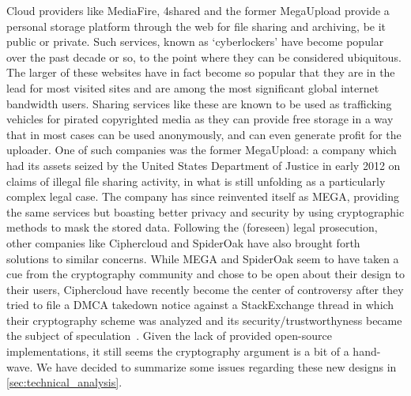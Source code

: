 \documentclass[12pt]{article}
\begin{document}


Cloud providers like MediaFire, 4shared and the former MegaUpload provide a personal storage platform through the web for file sharing and archiving, be it public or private.
Such services, known as `cyberlockers' have become popular over the past decade or so, to the point where they can be considered ubiquitous.
The larger of these websites have in fact become so popular that they are in the lead for most visited sites and are among the most significant global internet bandwidth users.
Sharing services like these are known to be used as trafficking vehicles for pirated copyrighted media as they can provide free storage in a way that in most cases can be used anonymously, and can even generate profit for the uploader.
One of such companies was the former MegaUpload: a company which had its assets seized by the United States Department of Justice in early 2012 on claims of illegal file sharing activity, in what is still unfolding as a particularly complex legal case.
The company has since reinvented itself as MEGA, providing the same services but boasting better privacy and security by using cryptographic methods to mask the stored data.
Following the (foreseen) legal prosecution, other companies like Ciphercloud and SpiderOak have also brought forth solutions to similar concerns.
While MEGA and SpiderOak seem to have taken a cue from the cryptography community and chose to be open about their design to their users, Ciphercloud have recently become the center of controversy after they tried to file a DMCA takedown notice against a StackExchange thread in which their cryptography scheme was analyzed and its security/trustworthyness became the subject of speculation~\cite{ciphercloud}.
Given the lack of provided open-source implementations, it still seems the cryptography argument is a bit of a hand-wave.
We have decided to summarize some issues regarding these new designs in \autoref{sec:technical_analysis}.
\end{document}
